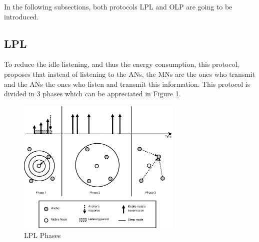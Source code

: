 In the following subsections, both protocols \ac{LPL} and \ac {OLP} are going to be introduced.

\subsection{\acl{LPL}}

To reduce the idle listening, and thus the energy consumption, this protocol, proposes that instead of listening to the \acp{AN}, the
\acp{MN} are the ones who transmit and the \acp{AN} the ones who listen and transmit this information. This protocol is divided in 3 
phases which can be appreciated in Figure \ref{fig:LPL}.

\begin{figure}[h]
 \begin{center}
  \includegraphics[width=0.7\textwidth]{LPL.eps}
 \end{center}
 \caption{LPL Phases \cite{LPLandOLP}}
 \label{fig:LPL}
\end{figure}

